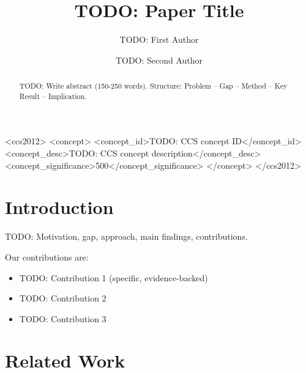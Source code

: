 \documentclass[sigconf,review,anonymous]{acmart}
\begin{document}
\title{TODO: Paper Title}

\author{TODO: First Author}

\author{TODO: Second Author}

\begin{abstract}
TODO: Write abstract (150-250 words).
Structure: Problem -- Gap -- Method -- Key Result -- Implication.
\end{abstract}

\begin{CCSXML}
<ccs2012>
  <concept>
    <concept_id>TODO: CCS concept ID</concept_id>
    <concept_desc>TODO: CCS concept description</concept_desc>
    <concept_significance>500</concept_significance>
  </concept>
</ccs2012>
\end{CCSXML}



\maketitle

\section{Introduction}
\label{sec:introduction}

TODO: Motivation, gap, approach, main findings, contributions.

Our contributions are:
\begin{itemize}
  \item TODO: Contribution 1 (specific, evidence-backed)
  \item TODO: Contribution 2
  \item TODO: Contribution 3
\end{itemize}

\section{Related Work}
\label{sec:related_work}
\end{document}
